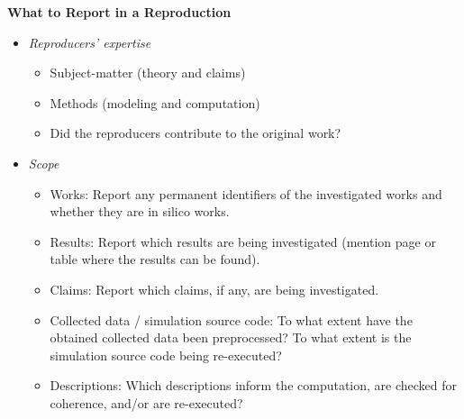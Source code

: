 \documentclass[authordate, meta]{jote-new-article}
\begin{document}
	\begin{fullWide}[Box 5]
	 \textbf{What to Report in a Reproduction}
	
	\begin{itemize}
		\item \emph{Reproducers’ expertise}
		\begin{itemize}[leftmargin=2.5em, label={\hspace{1em}\textbullet}]
			\item Subject-matter (theory and claims)
			\item Methods (modeling and computation)
			\item Did the reproducers contribute to the original work?
		\end{itemize}
		\item \emph{Scope}
		\begin{itemize}[leftmargin=2.5em, label={\hspace{1em}\textbullet}]
			\item Works: Report any permanent identifiers of the investigated works and whether they are in silico works.
			\item Results: Report which results are being investigated (mention page or table where the results can be found).
			\item Claims: Report which claims, if any, are being investigated.
			\item  Collected data / simulation source code: To what extent have the obtained collected data been preprocessed? To what extent is the simulation source code being re-executed?
			\item Descriptions: Which descriptions inform the computation, are checked for coherence, and/or are re-executed?
		\end{itemize}
	\end{itemize}


\end{fullWide}
\end{document}
